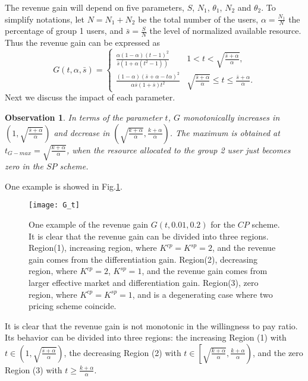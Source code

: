 \documentclass[twocolumn,10pt,twosided]{IEEEtran}
\newtheorem{observation}{Observation}
\begin{document}
The revenue gain will depend on five parameters, $S$, $N_1$, $\theta_1$, $N_2$ and $\theta_2$.
To simplify notations,  let $N=N_1+N_2$ be the total
number of the users, $\alpha=\frac{N_1}{N}$ the percentage of
group 1 users, and $\bar{s}=\frac{S}{N}$ the level of normalized
available resource. Thus the revenue gain can be expressed as
\begin{equation}
    G(t,\alpha,\bar{s})=
 \begin{cases}
   \frac{\alpha(1-\alpha)(t-1)^2}{\bar{s}(1+\alpha(t^2-1))} & 1<t<\sqrt{\frac{\bar{s}+\alpha}{\alpha}}, \\
   \frac{(1-\alpha)(\bar{s}+\alpha-t\alpha)^2}{\alpha\bar{s}(1+\bar{s})t^2} & \sqrt{\frac{\bar{s}+\alpha}{\alpha}}\le t\le\frac{\bar{s}+\alpha}{\alpha}.
  \end{cases}
\end{equation}
Next we discuss the impact of each parameter.
\begin{observation}
In terms of the parameter $t$, $G$ monotonically increases in  $\left(1,\sqrt{\frac{\bar{s}+\alpha}{\alpha}}\right)$ and decrease in $\left(\sqrt{\frac{k+\alpha}{\alpha}},\frac{k+\alpha}{\alpha}\right)$. The maximum is obtained at $t_{G-max}=\sqrt{\frac{k+\alpha}{\alpha}}$, when the resource allocated to the group 2 user just becomes zero in the $SP$ scheme.
\end{observation}

One example is showed in Fig.\ref{fig:G_t}.
\begin{figure}
\centering
\texttt{[image: G\_t]}
\caption{One example of the revenue gain $G(t,0.01,0.2)$  for the $CP$ scheme. It is clear that the revenue gain can be divided into three regions.  Region(1), increasing region, where $K^{cp}=K^{sp}=2$, and the revenue gain comes from the differentiation gain. Region(2), decreasing region,  where $K^{cp}=2$, $K^{sp}=1$, and the revenue gain comes from larger effective market and differentiation gain. Region(3), zero region, where $K^{cp}=K^{sp}=1$, and is a degenerating case where two pricing scheme coincide. }
\label{fig:G_t}
\end{figure}


It is clear that the revenue gain is not monotonic in the willingness to pay ratio. Its behavior can be divided into three regions: the increasing Region (1) with $t\in \left(1,\sqrt{\frac{\bar{s}+\alpha}{\alpha}}\right)$, the decreasing Region (2) with $t\in\left[\sqrt{\frac{k+\alpha}{\alpha}},\frac{k+\alpha}{\alpha}\right)$, and the zero Region (3) with $t\ge\frac{k+\alpha}{\alpha}$.
\end{document}
